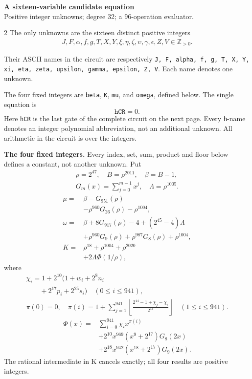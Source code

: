 \documentclass[10pt]{article}
\newcommand{\fl}[1]{\left\lfloor#1\right\rfloor}
\begin{document}
\begin{center}
{\large\bfseries A sixteen-variable candidate equation}\\[-1pt]
{\small Positive integer unknowns; degree 32; a 96-operation evaluator.}
\end{center}\vspace{-8pt}
\begin{multicols}{2}
\fontsize{8.6}{9.1}\selectfont
The only unknowns are the sixteen distinct positive integers
\[
\begin{gathered}J,F,\alpha,f,g,T,X,Y,\xi,\eta,\zeta,\upsilon,\gamma,\epsilon,Z,V\in\mathbb Z_{>0}.\end{gathered}
\]
{\raggedright Their ASCII names in the circuit are respectively
\texttt{J, F, alpha, f, g, T, X, Y, xi, eta, zeta, upsilon, gamma, epsilon, Z, V}. Each name denotes one unknown.\par}
The four fixed integers are \texttt{beta}, \texttt{K}, \texttt{mu}, and
\texttt{omega}, defined below. The single equation is
\[
\boxed{\texttt{hCR}=0.}
\]
Here \texttt{hCR} is the last gate of the complete circuit on the next page.
Every \texttt{h}-name denotes an integer polynomial abbreviation, not an
additional unknown. All arithmetic in the circuit is over the integers.

\textbf{The four fixed integers.}
Every index, set, sum, product and floor below defines a constant, not
another unknown. Put
\[
\begin{gathered}
\rho=2^{47},\quad B=\rho^{2011},\quad\beta=B-1,\\
G_m(x)=\sum_{j=0}^{m-1}x^j,\quad
\Lambda=\rho^{1005}.
\end{gathered}
\]
\begin{align*}
\mu={}&\beta-G_{951}(\rho)\\
&-\rho^{960}G_{26}(\rho)-\rho^{1004},\\
\omega={}&\beta+8G_{917}(\rho)-4+(2^{45}-4)\Lambda\\
&+\rho^{960}G_9(\rho)+\rho^{987}G_8(\rho)
  +\rho^{1004},\\
K={}&\rho^{18}+\rho^{1004}+\rho^{2020}\\
&+2\Lambda\Phi(1/\rho),
\end{align*}
where
\[
\begin{gathered}
\chi_i=1+2^{10}(1+w_i+2^8n_i\\
\qquad+2^{17}p_i+2^{25}s_i)\quad(0\le i\le941),\\
\pi(0)=0,\quad\pi(i)=1+\sum_{j=1}^{941}
\fl{\frac{2^{44}-1+\chi_j-\chi_i}{2^{44}}}\quad(1\le i\le941).
\end{gathered}
\]
\[
\begin{split}
\Phi(x)={}&\sum_{i=0}^{941}\chi_i x^{\pi(i)}\\
&+2^{10}x^{969}(x^9+2^{17})G_8(2x)\\
&+2^{18}x^{942}(x^{18}+2^{17})G_9(2x).
\end{split}
\]
The rational intermediate in K cancels exactly; all four results are positive integers.


\end{multicols}
\end{document}
